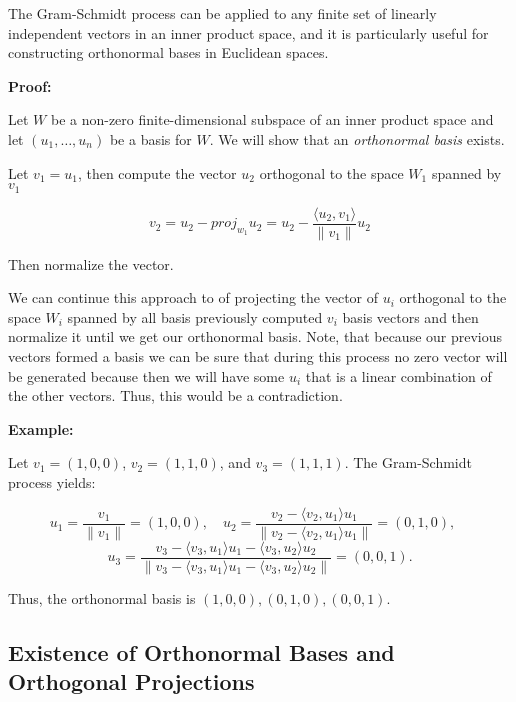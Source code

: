 The Gram-Schmidt process can be applied to any finite set of linearly independent vectors in an inner 
product space, and it is particularly useful for constructing orthonormal bases in Euclidean spaces.

\textbf{Proof:}

Let \(W\) be a non-zero finite-dimensional subspace of an inner product space and let 
\((u_1, \dots, u_n)\) be a basis for \(W\). We will show that an \emph{orthonormal basis} exists.

Let \(v_1 = u_1\), then compute the vector \(u_2\) orthogonal to the space \(W_1\) spanned by \(v_1\)

\[
    v_2 = u_2 - proj_{w_1} u_2 = u_2 - \frac{\langle u_2, v_1\rangle}{\|v_1\|} u_2
\]

Then normalize the vector.

We can continue this approach to of projecting the vector of \(u_i\) orthogonal to the space \(W_i\) 
spanned by all basis previously computed \(v_i\) basis vectors and then normalize it 
until we get our orthonormal basis. Note, that because our previous vectors formed a basis we can be 
sure that during this process no zero vector will be generated because then we will have 
some \(u_i\) that is a linear combination of the other vectors. Thus, this would be a contradiction.

\QED

\textbf{Example:}

Let \( v_1 = (1, 0, 0) \), \( v_2 = (1, 1, 0) \), and \( v_3 = (1, 1, 1) \). The Gram-Schmidt process 
yields:

\[
    u_1 = \frac{v_1}{\|v_1\|} = (1, 0, 0), \quad
    u_2 = \frac{v_2 - \langle v_2, u_1 \rangle u_1}{\|v_2 - \langle v_2, u_1 \rangle u_1\|} = 
    \left(0, 1, 0\right), \quad
\]
\[
    u_3 = \frac{v_3 - \langle v_3, u_1 \rangle u_1 - \langle v_3, u_2 \rangle u_2}{\|v_3 - \langle v_3, u_1 \rangle u_1 - \langle v_3, u_2 \rangle u_2\|} = \left(0, 0, 1\right).
\]

Thus, the orthonormal basis is \( (1, 0, 0), (0, 1, 0), (0, 0, 1) \).

\subsection{Existence of Orthonormal Bases and Orthogonal Projections}

